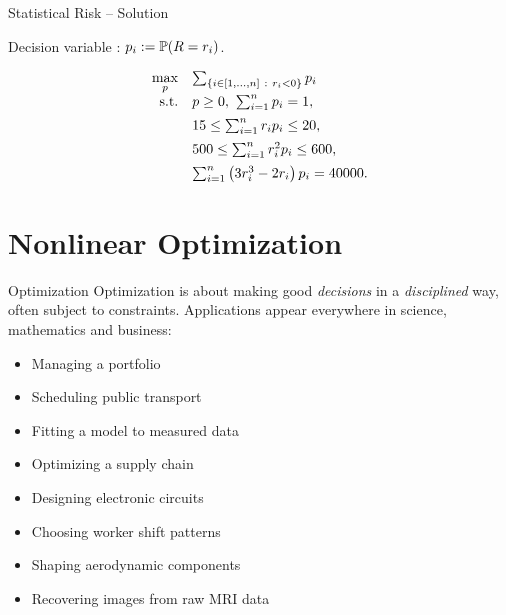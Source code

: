 \documentclass[9pt]{beamer}
\begin{document}
\begin{frame}{Statistical Risk -- Solution}
  
  Decision variable : $p_i := \mathbb P(R=r_i)$.
  
  \vfill
  
  \begin{equation*}
    \begin{array}{rl}
      {\displaystyle\max_{p}} & \sum_{\left\{ i\in[1, \dots, n]\ : \ r_i < 0 \right\}} p_i \\[0.5em]
      \mathrm{s.t.} & p\geq 0, ~\sum_{i=1}^n p_i = 1,\\[0.5em]
           &  15 \leq \sum_{i=1}^n r_i p_i \leq 20,\\[0.5em]
                & 500 \leq \sum_{i=1}^n r^2_i p_i \leq 600,\\[0.5em]
                & \sum_{i=1}^n \left( 3 r^3_i - 2r_i\right) p_i = 40000.
    \end{array}
  \end{equation*}
  
\end{frame}



\section{Nonlinear Optimization}

\begin{frame}{Optimization}
  Optimization is about making good \emph{decisions} in a \emph{disciplined} way, often subject to constraints. Applications appear everywhere in science, mathematics and business:

  \vfill
  
  \begin{itemize}
  \item Managing a portfolio
  \item Scheduling public transport
  \item Fitting a model to measured data
  \item Optimizing a supply chain
  \item Designing electronic circuits
  \item Choosing worker shift patterns
  \item Shaping aerodynamic components
  \item Recovering images from raw MRI data
  \end{itemize}

\end{frame}
\end{document}
